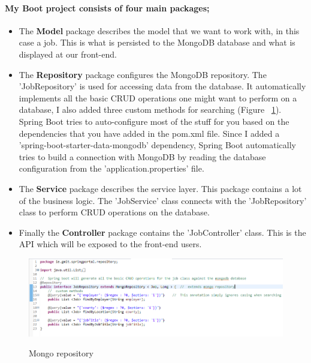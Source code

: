 \paragraph{My Boot project consists of four main packages;}
\begin{itemize}
    \item The \textbf{Model} package describes the model that we want to work with, in this case a job. This is what is persisted to the MongoDB database and what is displayed at our front-end.
    \item The \textbf{Repository} package configures the MongoDB repository. The 'JobRepository' is used for accessing data from the database. It automatically implements all the basic CRUD operations one might want to perform on a database, I also added three custom methods for searching (Figure ~\ref{repo_label}). Spring Boot tries to auto-configure most of the stuff for you based on the dependencies that you have added in the pom.xml file.
    Since I added a 'spring-boot-starter-data-mongodb' dependency, Spring Boot automatically tries to build a connection with MongoDB by reading the database configuration from the 'application.properties' file.
    \item The \textbf{Service} package describes the service layer. This package contains a lot of the business logic. The 'JobService' class connects with the 'JobRepository' class to perform CRUD operations on the database.
    \item Finally the \textbf{Controller} package contains the 'JobController' class. This is the API which will be exposed to the front-end users.
\end{itemize}
\begin{figure}[ht]
    \centering
    \includegraphics[scale=0.5]{Images/repo.png} 
    \label{repo_label}
    \caption{Mongo repository}
\end{figure}

